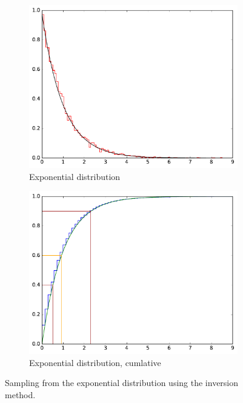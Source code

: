 \begin{figure}
    \centering
    \begin{subfigure}[b]{0.49\textwidth}
        \includegraphics[width=\textwidth]{figs/expo.pdf}
        \caption{Exponential distribution}
    \end{subfigure}
    \begin{subfigure}[b]{0.49\textwidth}
        \includegraphics[width=\textwidth]{figs/inversion_sampling.pdf}
        \caption{Exponential distribution, cumlative}
    \end{subfigure}
    \caption{Sampling from the exponential distribution using the inversion method.}
     \label{fig:expo_inv}
\end{figure}

